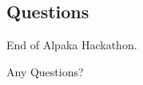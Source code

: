 \documentclass[9pt]{beamer}
\begin{document}
\subsection{Questions}
\begin{frame}
\Huge{\centerline{End of Alpaka Hackathon.}}
\Huge{\centerline{Any Questions?}}
\end{frame}

\end{document}
